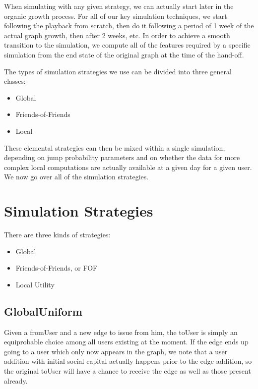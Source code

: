 \documentclass[10pt,oneside]{memoir}
\begin{document}
When simulating with any given strategy, we can actually start later in the organic growth process.  For all of our key simulation techniques, we start following the playback from scratch, then do it following a period of 1 week of the actual graph growth, then after 2 weeks, etc.  In order to achieve a smooth transition to the simulation, we compute all of the features required by a specific simulation from the end state of the original graph at the time of the hand-off.


The types of simulation strategies we use can be divided into three general classes:


\begin{itemize}


\item Global

\item Friends-of-Friends

\item Local
\end{itemize}

These elemental strategies can then be mixed within a single simulation, depending on jump probability parameters and on whether the data for more complex local computations are actually available at a given day for a given user.  We now go over all of the simulation strategies.


\pagebreak \section{Simulation Strategies}
\label{simulationstrategies}

There are three kinds of strategies:


\begin{itemize}


\item Global

\item Friends-of-Friends, or FOF

\item Local Utility
\end{itemize}

\subsection{GlobalUniform}
\label{globaluniform}

Given a fromUser and a new edge to issue from him, the toUser is simply an equiprobable choice among all users existing at the moment.  If the edge ends up going to a user which only now appears in the graph, we note that a user addition with initial social capital actually happens prior to the edge addition, so the original toUser will have a chance to receive the edge as well as those present already.
\end{document}
